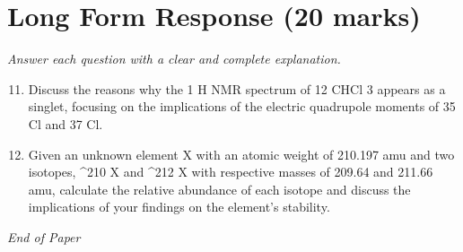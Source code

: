 \documentclass[12pt]{article}
\begin{document}
\section*{Long Form Response (20 marks)}
\textit{Answer each question with a clear and complete explanation.}
\begin{enumerate}[label=\arabic*.]
\setcounter{enumi}{10}
\item Discuss the reasons why the 1 H NMR spectrum of 12 CHCl 3 appears as a singlet, focusing on the implications of the electric quadrupole moments of 35 Cl and 37 Cl.
\item Given an unknown element X with an atomic weight of 210.197 amu and two isotopes, ^210 X and ^212 X with respective masses of 209.64 and 211.66 amu, calculate the relative abundance of each isotope and discuss the implications of your findings on the element's stability.
\end{enumerate}

\vfill
\noindent\textit{End of Paper}
\end{document}
